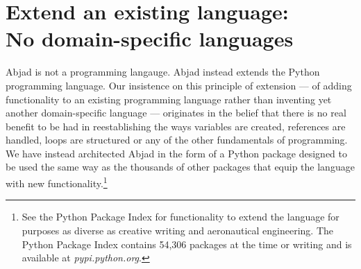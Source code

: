 \documentclass{article}
\begin{document}
\section{Extend an existing language: \\ No domain-specific languages}

Abjad is not a programming langauge. Abjad instead extends the Python
programming language. Our insistence on this principle of extension --- of
adding functionality to an existing programming language rather than inventing
yet another domain-specific language --- originates in the belief that there is
no real benefit to be had in reestablishing the ways variables are created,
references are handled, loops are structured or any of the other fundamentals
of programming. We have instead architected Abjad in the form of a Python
package designed to be used the same way as the thousands of other packages
that equip the language with new functionality.\footnote{See the Python Package
Index for functionality to extend the language for purposes as diverse as
creative writing and aeronautical engineering. The Python Package Index
contains 54,306 packages at the time or writing and is available at
\textit{pypi.python.org}.}
\end{document}

